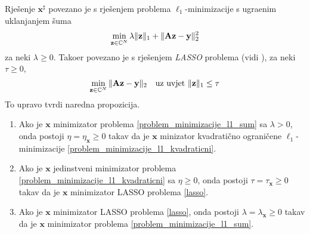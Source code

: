 \documentclass[a4paper,twoside,12pt]{memoir} %
\newcommand{\vect}[1]{\mathbf{#1}}
\renewcommand{\vec}{\vect}
\newcommand{\norm}[1]{\|{#1}\|}
\begin{document}
Rje\v{s}enje $\vec x^{\sharp}$ povezano je s rje\v{s}enjem problema $\ell_1$-minimizacije s ugra\dj enim uklanjanjem \v{s}uma
\begin{equation}\label{problem_minimizacije_l1_sum}
    \min_{\vec z \in \C^N} \lambda\norm{\vec z}_1 + \norm{\vec{Az}-\vec y}_2^2
\end{equation}
za neki $\lambda \geq 0$. Tako\dj er povezano je s rje\v{s}enjem \textit{LASSO} problema (vidi \cite{tibshirani96regression}), za neki $\tau \geq 0$,
\begin{equation}\label{lasso}
    \min_{\vec z \in \C^N} \norm{\vec{Az}-\vec y}_2\quad \text{uz uvjet } \norm{\vec z}_1\leq \tau
\end{equation}
To upravo tvrdi naredna propozicija.
\begin{prop}
    \begin{enumerate}[label=(\alph*)]
        \item Ako je $\vec x$ minimizator problema \eqref{problem_minimizacije_l1_sum} sa $\lambda > 0$, onda postoji $\eta = \eta_{\vec x} \geq 0$ takav da je $\vec x$ minizator kvadrati\v{c}no ograni\v{c}ene $\ell_1$-minimizacije \eqref{problem_minimizacije_l1_kvadraticni}.
        \item Ako je $\vec x$ jedinstveni minimizator problema \eqref{problem_minimizacije_l1_kvadraticni} sa $\eta \geq 0$, onda postoji $\tau = \tau_{\vec x} \geq 0$ takav da je $\vec x$ minimizator LASSO problema \eqref{lasso}.
        \item Ako je $\vec x$ minimizator LASSO problema \eqref{lasso}, onda postoji $\lambda = \lambda_{\vec x} \geq  0$ takav da je $\vec x$ minimizator problema \eqref{problem_minimizacije_l1_sum}.
    \end{enumerate}
\end{prop}
\end{document}
